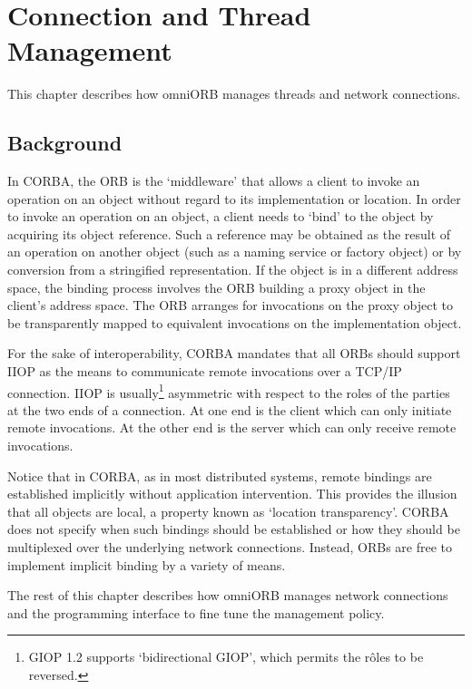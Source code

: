 \documentclass[11pt,twoside,a4paper]{book}
\begin{document}
\chapter{Connection and Thread Management}
\label{chap:connections}


This chapter describes how omniORB manages threads and network
connections.

\section{Background}

In CORBA, the ORB is the `middleware' that allows a client to invoke
an operation on an object without regard to its implementation or
location. In order to invoke an operation on an object, a client needs
to `bind' to the object by acquiring its object reference. Such a
reference may be obtained as the result of an operation on another
object (such as a naming service or factory object) or by conversion
from a stringified representation. If the object is in a different
address space, the binding process involves the ORB building a proxy
object in the client's address space. The ORB arranges for invocations
on the proxy object to be transparently mapped to equivalent
invocations on the implementation object.

For the sake of interoperability, CORBA mandates that all ORBs should
support IIOP as the means to communicate remote invocations over a
TCP/IP connection. IIOP is usually\footnote{GIOP 1.2 supports
`bidirectional GIOP', which permits the r\^oles to be reversed.}
asymmetric with respect to the roles of the parties at the two ends of
a connection. At one end is the client which can only initiate remote
invocations. At the other end is the server which can only receive
remote invocations.

Notice that in CORBA, as in most distributed systems, remote bindings
are established implicitly without application intervention. This
provides the illusion that all objects are local, a property known as
`location transparency'. CORBA does not specify when such bindings
should be established or how they should be multiplexed over the
underlying network connections. Instead, ORBs are free to implement
implicit binding by a variety of means.

The rest of this chapter describes how omniORB manages network
connections and the programming interface to fine tune the management
policy.
\end{document}
